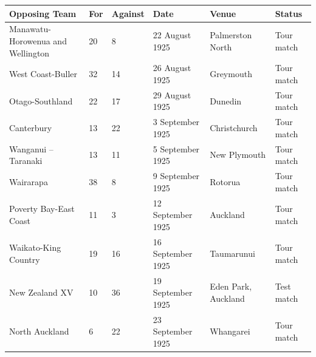 \documentclass{article}
\begin{document}
\begin{tabular}{llllll}
\toprule
Opposing Team & For & Against & Date & Venue & Status \\
\midrule
Manawatu-Horowenua and Wellington & 20 & 8 & 22 August 1925 & Palmerston North & Tour match \\
West Coast-Buller & 32 & 14 & 26 August 1925 & Greymouth & Tour match \\
Otago-Southland & 22 & 17 & 29 August 1925 & Dunedin & Tour match \\
Canterbury & 13 & 22 & 3 September 1925 & Christchurch & Tour match \\
Wanganui – Taranaki & 13 & 11 & 5 September 1925 & New Plymouth & Tour match \\
Wairarapa & 38 & 8 & 9 September 1925 & Rotorua & Tour match \\
Poverty Bay-East Coast & 11 & 3 & 12 September 1925 & Auckland & Tour match \\
Waikato-King Country & 19 & 16 & 16 September 1925 & Taumarunui & Tour match \\
New Zealand XV & 10 & 36 & 19 September 1925 & Eden Park, Auckland & Test match \\
North Auckland & 6 & 22 & 23 September 1925 & Whangarei & Tour match \\
\bottomrule
\end{tabular}
\end{document}
